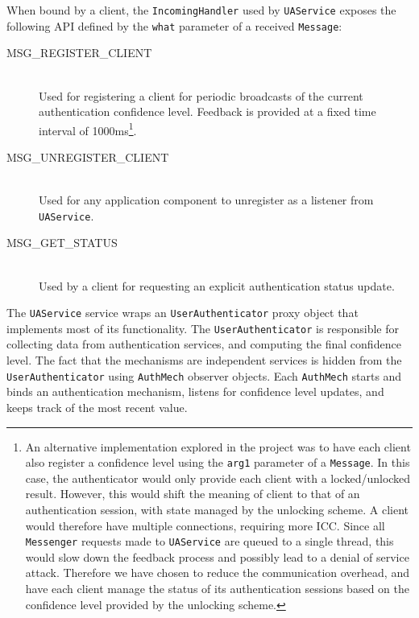 When bound by a client, the {\tt IncomingHandler} used by {\tt UAService}  exposes the following API defined by the {\tt what} parameter of a received {\tt Message}: 
\begin{description}
  \item[MSG\_REGISTER\_CLIENT] \hfill \\
  Used for registering a client for periodic broadcasts of the current authentication confidence level. Feedback is provided at a fixed time interval of 1000ms\footnote{An alternative implementation explored in the project was to have each client also register a confidence level using the {\tt arg1} parameter of a {\tt Message}. In this case, the authenticator would only provide each client with a locked/unlocked result. However, this would shift the meaning of client to that of an authentication session, with state managed by the unlocking scheme. A client would therefore have multiple connections, requiring more ICC. Since all {\tt Messenger} requests made to {\tt UAService} are queued to a single thread, this would slow down the feedback process and possibly lead to a denial of service attack. Therefore we have chosen to reduce the communication overhead, and have each client manage the status of its authentication sessions based on the confidence level provided by the unlocking scheme.}.

  \item[MSG\_UNREGISTER\_CLIENT] \hfill \\
  Used for any application component to unregister as a listener from {\tt UAService}.
  
  \item[MSG\_GET\_STATUS] \hfill \\
  Used by a client for requesting an explicit authentication status update.
\end{description}

The {\tt UAService} service wraps an {\tt UserAuthenticator} proxy object that implements most of its functionality. The {\tt UserAuthenticator} is responsible for collecting data from authentication services, and computing the final confidence level. The fact that the mechanisms are independent services is hidden from the {\tt UserAuthenticator} using {\tt AuthMech} observer objects. Each {\tt AuthMech} starts and binds an authentication mechanism, listens for confidence level updates, and keeps track of the most recent value.
 
